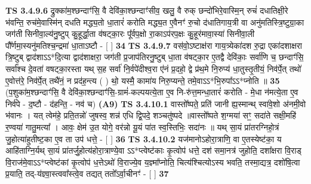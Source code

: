 \documentclass[17pt]{extarticle}
\begin{document}
                  \newline
                                \textbf{ TS 3.4.9.6} \newline
                  द्रुक्का॑म॒श्छन्दाꣳ॑सि॒ वै देवि॑का॒श्छन्दाꣳ॑सीव॒ खलु॒ वै रुक् छन्दो॑भिरे॒वास्मि॒न् रुचं॑ दधातिक्षी॒रे भ॑वन्ति॒ रुच॑मे॒वास्मि॑न् दधति मद्ध्य॒तो धा॒तारं॑ करोति मद्ध्य॒त ए॒वैनꣳ॑ रु॒चो द॑धातिगाय॒त्री वा अनु॑मतिस्त्रि॒ष्टुग्रा॒का जग॑ती सिनीवा॒ल्य॑नु॒ष्टुप् कु॒हूर्द्धा॒ता व॑षट्का॒रः पू᳚र्वप॒क्षो रा॒काऽप॑रप॒क्षः कु॒हूर॑मावा॒स्या॑ सिनीवा॒ली पौ᳚र्णमा॒स्यनु॑मतिश्च॒न्द्रमा॑ धा॒ताऽष्टौ - [  ] \textbf{  34} \newline
                  \newline
                                \textbf{ TS 3.4.9.7} \newline
                  वस॑वो॒ऽष्टाक्ष॑रा गाय॒त्र्येका॑दश रु॒द्रा एका॑दशाक्षरा त्रि॒ष्टुब् द्वाद॑शाऽऽ*दि॒त्या द्वाद॑शाक्षरा॒ जग॑ती प्र॒जाप॑तिरनु॒ष्टुब् धा॒ता व॑षट्का॒र ए॒तद्वै देवि॑काः॒ सर्वा॑णि च॒ छन्दाꣳ॑सि॒ सर्वा᳚श्च दे॒वता॑ वषट्का॒रस्ता यथ् स॒ह सर्वा॑ नि॒र्वपे॑दीश्व॒रा ए॑नं प्र॒दहो॒ द्वे प्र॑थ॒मे नि॒रुप्य॑ धा॒तुस्तृ॒तीयं॒ निव॑र्पे॒त् तथो॑ ए॒वोत्त॑रे॒ निव॑र्पे॒त् तथै॑नं॒ न प्रद॑ह॒न्त्य ( ) थो॒ यस्मै॒ कामा॑य निरु॒प्यन्ते॒ तमे॒वाऽऽ*भि॒रुपा᳚ऽऽ*प्नोति ॥ \textbf{  35} \newline
                  \newline
                      (प॒शुका॑म॒श्छन्दाꣳ॑सि॒ वै देवि॑का॒श्छन्दाꣳ॑सि॒-ग्रामं॑-कल्पयत्ये॒ता ए॒व नि-रु॑त्त॒मन्धा॒तारं॑ करोति - मे॒धा न॑मत्ये॒ता ए॒व निर्व॑पे - द॒ष्टौ - द॑हन्ति॒ - नव॑ च)  \textbf{(A9)} \newline \newline
                                        \textbf{ TS 3.4.10.1} \newline
                  वास्तो᳚ष्पते॒ प्रति॑ जानी ह्य॒स्मान्थ् स्वा॑वे॒शो अ॑नमी॒वो भ॑वानः । यत् त्वेम॑हे॒ प्रति॒तन्नो॑ जुषस्व॒ शन्न॑ एधि द्वि॒पदे॒ शञ्चतु॑ष्पदे ॥वास्तो᳚ष्पते श॒ग्मया॑ सꣳ॒॒ सदा॑ते सक्षी॒महि॑ र॒ण्वया॑ गातु॒मत्या᳚ । आवः॒ क्षेम॑ उ॒त योगे॒ वर॑न्नो यू॒यं पा॑त स्व॒स्तिभिः॒ सदा॑नः ॥ यथ् सा॒यं प्रा॑तरग्निहो॒त्रं जु॒होत्या॑हुतीष्ट॒का ए॒व ता उप॑ धत्ते॒ - [  ] \textbf{  36} \newline
                  \newline
                                \textbf{ TS 3.4.10.2} \newline
                  यज॑मानोऽहोरा॒त्राणि॒ वा ए॒तस्येष्ट॑का॒ य आहि॑ताग्नि॒र्यथ् सा॒यं प्रा॑तर्जु॒होत्य॑होरा॒त्राण्ये॒वा ऽऽ*प्त्वेष्ट॑काः कृ॒त्वोप॑ धत्ते॒ दश॑ समा॒नत्र॑ जुहोति॒ दशा᳚क्षरा वि॒राड् वि॒राज॑मे॒वाऽऽ*प्त्वेष्ट॑कां कृ॒त्वोप॑ ध॒त्तेऽथो॑ वि॒राज्ये॒व य॒ज्ञ्मा᳚प्नोति॒ चित्य॑श्चित्योऽस्य भवति॒ तस्मा॒द्यत्र॒ दशो॑षि॒त्वा प्र॒याति॒ तद्-य॑ज्ञ्वा॒स्त्ववा᳚स्त्वे॒व तद्यत् ततो᳚ऽर्वा॒चीनꣳ॑ - [  ] \textbf{  37} \newline
\end{document}
